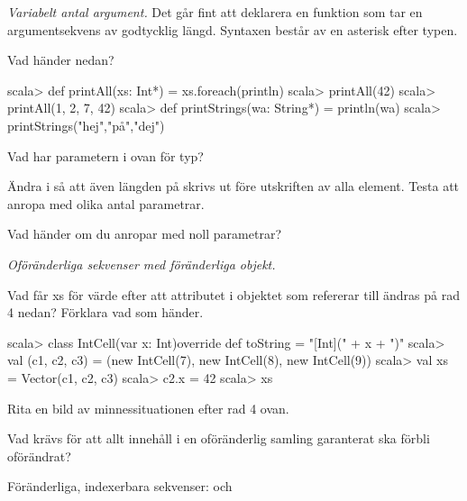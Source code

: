 ﻿%


\Exercise{\ExeWeekSIX}\label{exe:W06}

\begin{Goals}

\end{Goals}

\begin{Preparations}
\item {}
\end{Preparations}

\BasicTasks %

\Task \emph{Variabelt antal argument.} Det går fint att deklarera en funktion som tar en argumentsekvens av godtycklig längd. Syntaxen består av en asterisk \code{*} efter typen.

\Subtask Vad händer nedan?
\begin{REPL}
scala> def printAll(xs: Int*) = xs.foreach(println)
scala> printAll(42)
scala> printAll(1, 2, 7, 42)
scala> def printStrings(wa: String*) = println(wa)
scala> printStrings("hej","på","dej")
\end{REPL}

\Subtask Vad har parametern  i  ovan för typ?

\Subtask Ändra i  så att även längden på  skrivs ut före utskriften av alla element. Testa att anropa  med olika antal parametrar.

\Subtask Vad händer om du anropar  med noll parametrar?

\Task \emph{Oföränderliga sekvenser med föränderliga objekt.}

\Subtask Vad får xs för värde efter att attributet i objektet som  refererar till ändras på rad 4 nedan? Förklara vad som händer.
\begin{REPL}
scala> class IntCell(var x: Int){override def toString = "[Int](" + x + ")"}
scala> val (c1, c2, c3) = (new IntCell(7), new IntCell(8), new IntCell(9))
scala> val xs = Vector(c1, c2, c3)
scala> c2.x = 42
scala> xs
\end{REPL}

\Subtask\Pen Rita en bild av minnessituationen efter rad 4 ovan.

\Subtask\Pen Vad krävs för att allt innehåll i en oföränderlig samling garanterat ska förbli oförändrat?

\Task Föränderliga, indexerbara sekvenser:  och 

